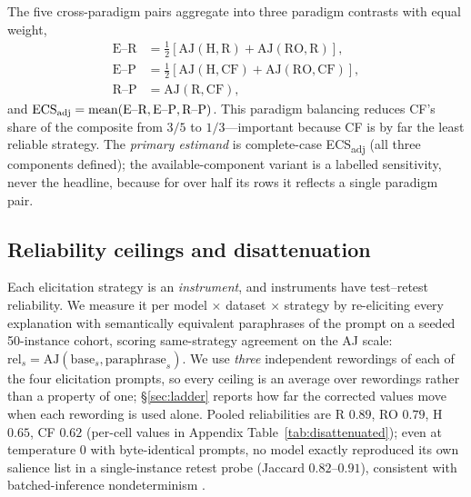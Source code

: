 \documentclass[11pt]{article}
\newcommand{\ecsadj}{\mbox{ECS\textsubscript{adj}}}
\newcommand{\aj}{\mathrm{AJ}}
\begin{document}
The five cross-paradigm pairs aggregate into three paradigm contrasts with equal weight,
\begin{align*}
\text{E--R} &= \tfrac12[\aj(\mathrm{H,R})+\aj(\mathrm{RO,R})],\\
\text{E--P} &= \tfrac12[\aj(\mathrm{H,CF})+\aj(\mathrm{RO,CF})],\\
\text{R--P} &= \aj(\mathrm{R,CF}),
\end{align*}
and $\ecsadj=\mathrm{mean}(\text{E--R},\text{E--P},\text{R--P})$. This paradigm balancing reduces CF's share of the composite from $3/5$ to $1/3$---important because CF is by far the least reliable strategy. The \emph{primary estimand} is complete-case \ecsadj{} (all three components defined); the available-component variant is a labelled sensitivity, never the headline, because for over half its rows it reflects a single paradigm pair.

\subsection{Reliability ceilings and disattenuation}
\label{sec:disatt}

Each elicitation strategy is an \emph{instrument}, and instruments have test--retest reliability. We measure it per model $\times$ dataset $\times$ strategy by re-eliciting every explanation with semantically equivalent paraphrases of the prompt on a seeded 50-instance cohort, scoring same-strategy agreement on the AJ scale: $\mathrm{rel}_s = \aj(\text{base}_s,\text{paraphrase}_s)$. We use \emph{three} independent rewordings of each of the four elicitation prompts, so every ceiling is an average over rewordings rather than a property of one; \S\ref{sec:ladder} reports how far the corrected values move when each rewording is used alone. Pooled reliabilities are R $0.89$, RO $0.79$, H $0.65$, CF $0.62$ (per-cell values in Appendix Table~\ref{tab:disattenuated}); even at temperature 0 with byte-identical prompts, no model exactly reproduced its own salience list in a single-instance retest probe (Jaccard $0.82$--$0.91$), consistent with batched-inference nondeterminism \citep{thinkingmachines2025nondeterminism}.
\end{document}

